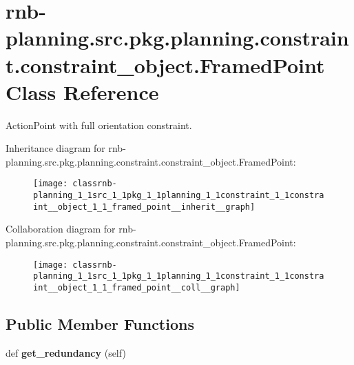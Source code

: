 \hypertarget{classrnb-planning_1_1src_1_1pkg_1_1planning_1_1constraint_1_1constraint__object_1_1_framed_point}{}\section{rnb-\/planning.src.\+pkg.\+planning.\+constraint.\+constraint\+\_\+object.\+Framed\+Point Class Reference}
\label{classrnb-planning_1_1src_1_1pkg_1_1planning_1_1constraint_1_1constraint__object_1_1_framed_point}


Action\+Point with full orientation constraint.  




Inheritance diagram for rnb-\/planning.src.\+pkg.\+planning.\+constraint.\+constraint\+\_\+object.\+Framed\+Point\+:\nopagebreak
\begin{figure}[H]
\begin{center}
\leavevmode
\texttt{[image: classrnb-planning\_1\_1src\_1\_1pkg\_1\_1planning\_1\_1constraint\_1\_1constraint\_\_object\_1\_1\_framed\_point\_\_inherit\_\_graph]}
\end{center}
\end{figure}


Collaboration diagram for rnb-\/planning.src.\+pkg.\+planning.\+constraint.\+constraint\+\_\+object.\+Framed\+Point\+:\nopagebreak
\begin{figure}[H]
\begin{center}
\leavevmode
\texttt{[image: classrnb-planning\_1\_1src\_1\_1pkg\_1\_1planning\_1\_1constraint\_1\_1constraint\_\_object\_1\_1\_framed\_point\_\_coll\_\_graph]}
\end{center}
\end{figure}
\subsection*{Public Member Functions}
\begin{DoxyCompactItemize}
\item 
\mbox{\label{classrnb-planning_1_1src_1_1pkg_1_1planning_1_1constraint_1_1constraint__object_1_1_framed_point_ab912d6c12a355a4f0f7365aa5cb28543}} 
def {\bfseries get\+\_\+redundancy} (self)
\end{DoxyCompactItemize}
